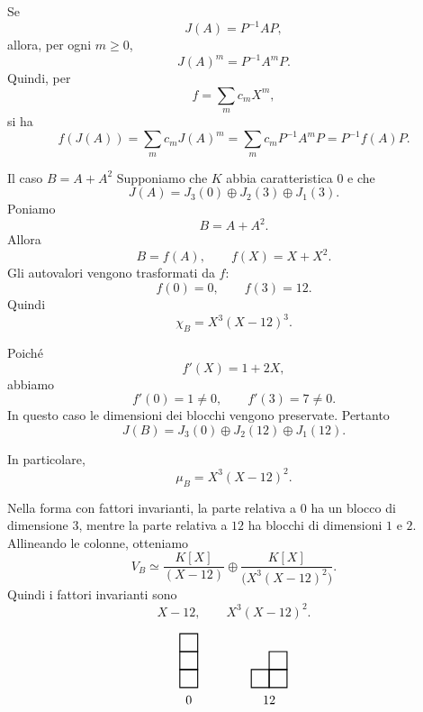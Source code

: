 \documentclass[a4paper]{article}
\begin{document}
\begin{radioactive}
\begin{snippetproof}{}
    Se
    \[
        J(A)=P^{-1}AP,
    \]
    allora, per ogni \(m\geq 0\),
    \[
        J(A)^m=P^{-1}A^mP.
    \]
    Quindi, per
    \[
        f=\sum_m c_mX^m,
    \]
    si ha
    \[
        f(J(A))
        =
        \sum_m c_mJ(A)^m
        =
        \sum_m c_mP^{-1}A^mP
        =
        P^{-1}f(A)P.
    \]
\end{snippetproof}
\end{radioactive}

\begin{radioactive}
\begin{snippetexample}{Il caso \(B=A+A^2\)}
    Supponiamo che \(K\) abbia caratteristica \(0\) e che
    \[
        J(A)=J_3(0)\oplus J_2(3)\oplus J_1(3).
    \]
    Poniamo
    \[
        B=A+A^2.
    \]
    Allora
    \[
        B=f(A),
        \qquad
        f(X)=X+X^2.
    \]
    Gli autovalori vengono trasformati da \(f\):
    \[
        f(0)=0,
        \qquad
        f(3)=12.
    \]
    Quindi
    \[
        \chi_B=X^3(X-12)^3.
    \]

    Poiché
    \[
        f'(X)=1+2X,
    \]
    abbiamo
    \[
        f'(0)=1\neq 0,
        \qquad
        f'(3)=7\neq 0.
    \]
    In questo caso le dimensioni dei blocchi vengono preservate. Pertanto
    \[
        J(B)=J_3(0)\oplus J_2(12)\oplus J_1(12).
    \]

    In particolare,
    \[
        \mu_B=X^3(X-12)^2.
    \]

    Nella forma con fattori invarianti, la parte relativa a \(0\) ha un blocco di dimensione \(3\), mentre la parte relativa a \(12\) ha blocchi di dimensioni \(1\) e \(2\). Allineando le colonne, otteniamo
    \[
        V_B\simeq
        \frac{K[X]}{(X-12)}
        \oplus
        \frac{K[X]}{\big(X^3(X-12)^2\big)}.
    \]
    Quindi i fattori invarianti sono
    \[
        X-12,
        \qquad
        X^3(X-12)^2.
    \]
\end{snippetexample}
\end{radioactive}

\begin{radioactive}
\[
    \begin{tikzpicture}[scale=0.5]
        \foreach \x/\h in {0/3} {
            \foreach \y in {1,...,\h} {
                \draw[thick] (\x,\y-1) rectangle (\x+1,\y);
            }
        }
        \node at (0.5,-0.7) {\(0\)};

        \begin{scope}[xshift=4cm]
            \foreach \x/\h in {0/1,1/2} {
                \foreach \y in {1,...,\h} {
                    \draw[thick] (\x,\y-1) rectangle (\x+1,\y);
                }
            }
            \node at (1,-0.7) {\(12\)};
        \end{scope}
    \end{tikzpicture}
\]
\end{radioactive}
\end{document}
